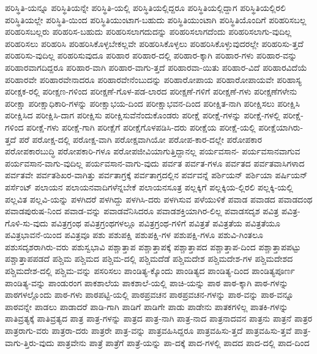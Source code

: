 {ಪರಿಸ್ಥಿತಿ-ಯನ್ನೂ
ಪರಿಸ್ಥಿತಿಯನ್ನೇ
ಪರಿಸ್ಥಿತಿ-ಯಲ್ಲಿ
ಪರಿಸ್ಥಿತಿಯಲ್ಲಿದ್ದರೂ
ಪರಿಸ್ಥಿತಿಯಲ್ಲಿದ್ದಾಗ
ಪರಿಸ್ಥಿತಿಯಲ್ಲಿರಲಿ
ಪರಿಸ್ಥಿತಿಯಲ್ಲೇ
ಪರಿಸ್ಥಿತಿ-ಯಿಂದ
ಪರಿಸ್ಥಿತಿಯುಂಟಾಗ-ಬಹುದು
ಪರಿಸ್ಥಿತಿಯುಂಟಾಗಿ
ಪರಿಸ್ಥಿತಿಯೊಂದಿಗೆ
ಪರಿಹರಿಸಬಲ್ಲ
ಪರಿಹರಿಸಬಲ್ಲರು
ಪರಿಹರಿಸ-ಬಹುದು
ಪರಿಹರಿಸಲಾಗದುದನ್ನು
ಪರಿಹರಿಸಲಾಗದೆಂದು
ಪರಿಹರಿಸಲಾಗು-ವುದಿಲ್ಲ
ಪರಿಹರಿಸಲು
ಪರಿಹರಿಸಿ
ಪರಿಹರಿಸಿಕೊಳ್ಳಬೇಕಲ್ಲವೇ
ಪರಿಹರಿಸಿಕೊಳ್ಳಲು
ಪರಿಹರಿಸಿಕೊಳ್ಳುವುದರಲ್ಲೇ
ಪರಿಹರಿಸು-ತ್ತದೆ
ಪರಿಹರಿಸು-ವುದಿಲ್ಲ
ಪರಿಹರಿಸುವುದೂ
ಪರಿಹಾರ
ಪರಿಹಾರ-ದಲ್ಲಿ
ಪರಿಹಾರ-ಕ್ಕಾಗಿ
ಪರಿಹಾರ-ಗಳು
ಪರಿಹಾರ-ವನ್ನು
ಪರಿಹಾರವಾಗದಿದ್ದರೂ
ಪರಿಹಾರ-ವಾಗಿ
ಪರಿಹಾರ-ವಾಗು-ತ್ತದೆ
ಪರಿಹಾರವಾ-ಯಿತು
ಪರಿಹಾರ-ವಿದೆ
ಪರಿಹಾರವಿದೆಯೆ
ಪರಿಹಾರವೇ
ಪರಿಹಾರವೇನಾದರೂ
ಪರಿಹಾರವೇನೆಂಬುದನ್ನು
ಪರಿಹಾರೋಪಾಯ
ಪರಿಹಾರೋಪಾಯವೇ
ಪರಿಹಾಸ್ಯ
ಪರೀಕ್ಷಕ-ರಲ್ಲಿ
ಪರೀಕ್ಷಣ-ಗಳಿಂದ
ಪರೀಕ್ಷಣೆ-ಗೊಳ-ಪಡ-ಲಾರದ
ಪರೀಕ್ಷಣೆ-ಗಳಿಗೆ
ಪರೀಕ್ಷಣೆ-ಗಳು
ಪರೀಕ್ಷಣೆಗಳೇನು
ಪರೀಕ್ಷಾ
ಪರೀಕ್ಷಾಧಿಕಾರಿ-ಗಳನ್ನು
ಪರೀಕ್ಷಾಭಯ-ದಿಂದ
ಪರೀಕ್ಷಾಭವನ-ದಿಂದ
ಪರೀಕ್ಷಿತ-ನಾಗಿ
ಪರೀಕ್ಷಿಸಲು
ಪರೀಕ್ಷಿಸಿ
ಪರೀಕ್ಷಿಸಿದ
ಪರೀಕ್ಷಿಸಿ-ದಾಗ
ಪರೀಕ್ಷಿಸು
ಪರೀಕ್ಷಿಸುವೆನೆಂದುಕೊಂಡರು
ಪರೀಕ್ಷೆ
ಪರೀಕ್ಷೆ-ಗಳನ್ನು
ಪರೀಕ್ಷೆ-ಗಳಲ್ಲಿ
ಪರೀಕ್ಷೆ-ಗಳಿಂದ
ಪರೀಕ್ಷೆ-ಗಳು
ಪರೀಕ್ಷೆ-ಗಾಗಿ
ಪರೀಕ್ಷೆಗೆ
ಪರೀಕ್ಷೆಗೊಳಪಡಿಸಿ-ದರು
ಪರೀಕ್ಷೆಯ
ಪರೀಕ್ಷೆ-ಯಲ್ಲಿ
ಪರೀಕ್ಷೆಯಾಗಿರು-ತ್ತದೆ
ಪರೆ
ಪರೋಕ್ಷ-ದಲ್ಲಿ
ಪರೋಕ್ಷ-ವಾಗಿ
ಪರೋಕ್ಷವಾಗಿಯೋ
ಪರೋಪ-ಕಾರ-ದಲ್ಲೇ
ಪರೋಪಕಾರ
ಪರೋಪಕಾರಬುದ್ಧಿ
ಪರೋಪಕಾರಿ-ಗಳೂ
ಪರೋಪಜೀವಿಯಾಗುತ್ತಿದ್ದಾನಲ್ಲ
ಪರ್ಯವಸಾನ-
ಪರ್ಯವಸಾನವಾಗುವ
ಪರ್ಯವಸಾನ-ವಾಗು-ವುದಿಲ್ಲ
ಪರ್ಯವಸಾನ-ವಾಗು-ವುದು
ಪರ್ವತ
ಪರ್ವತ-ಗಳೂ
ಪರ್ವತದ
ಪರ್ವತವಾಸಿಗಳಾದ
ಪರ್ವತವೇ
ಪರ್ವತಶಿಖರ-ವಾಗಿತ್ತು
ಪರ್ವತಾಗ್ರಕ್ಕೆ
ಪರ್ವತಾಗ್ರದಲ್ಲಿನ
ಪರ್ವವನ್ನೆ
ಪರ್ಶಿಯನ್
ಪರ್ಶಿಯಾ
ಪರ್ಷಿಯನ್
ಪರ್ಸೆಂಟ್
ಪಲಾಯನ
ಪಲಾಯನವಾದಿಗಳೆನ್ನಬೇಕೆ
ಪಲಾಯನಸೂತ್ರ
ಪಲ್ಲಕ್ಕಿಗೆ
ಪಲ್ಲಕ್ಕಿಯ-ಲ್ಲಿರಲಿ
ಪಲ್ಲಕ್ಕಿ-ಯಲ್ಲಿ
ಪಲ್ಲವಿತ
ಪಲ್ಲವಿ-ಯನ್ನು
ಪಳಗಿದರೆ
ಪಳಗಿದ್ದು
ಪಳಗಿಸಿ-ದರು
ಪಳಗಿಸುವ
ಪಳೆಯುಳಿಕೆ
ಪವಾಡ
ಪವಾಡದ
ಪವಾಡದಂಥ
ಪವಾಡಪುರುಷ-ನಿಂದ
ಪವಾಡ-ವನ್ನು
ಪವಾಡವೆನಿಸಿದರೂ
ಪವಾಡಶಕ್ತಿಯಾಗಿರ-ಲಿಲ್ಲ
ಪವಾಡಸದೃಶ
ಪವಿತ್ರ
ಪವಿತ್ರ-ಗೊಳಿ-ಸು-ವುದು
ಪವಿತ್ರಗ್ರಂಥ
ಪವಿತ್ರಗ್ರಂಥಗಳಲ್ಲೂ
ಪವಿತ್ರಗ್ರಂಥ-ಗಳಿಗೆ
ಪವಿತ್ರತೆ
ಪವಿತ್ರತೆಯ
ಪವಿತ್ರತೆಯೂ
ಪವಿತ್ರಭಾವನೆ-ಯಿಂದ
ಪವಿತ್ರವೂ
ಪಶು
ಪಶುಪಕ್ಷಿ
ಪಶುಪಕ್ಷಿ-ಗಳ
ಪಶುಪಕ್ಷಿ-ಗಳೂ
ಪಶುವಿ-ಗಿಂತಲೂ
ಪಶುಸದೃಶರಾಗಿರು-ವರು
ಪಶುಸ್ವಭಾವಿ
ಪಶ್ಚಾತ್ತಾಪ
ಪಶ್ಚಾತ್ತಾಪಕ್ಕೆ
ಪಶ್ಚಾತ್ತಾಪದ
ಪಶ್ಚಾತ್ತಾಪ-ದಿಂದ
ಪಶ್ಚಾತ್ತಾಪಪಟ್ಟು
ಪಶ್ಚಾತ್ತಾಪಪಡದೆ
ಪಶ್ಚಿಮ
ಪಶ್ಚಿಮದ
ಪಶ್ಚಿಮ-ದಲ್ಲಿ
ಪಶ್ಚಿಮದೆಡೆ
ಪಶ್ಚಿಮದೇಶ
ಪಶ್ಚಿಮದೇಶ-ಗಳ
ಪಶ್ಚಿಮದೇಶದ
ಪಶ್ಚಿಮದೇಶ-ದಲ್ಲಿ
ಪಶ್ಚಿಮ-ವನ್ನು
ಪಸರಿಸಲು
ಪಾಂಡಿತ್ಯ-ಕ್ಕೊಂದು
ಪಾಂಡಿತ್ಯದ
ಪಾಂಡಿತ್ಯ-ದಿಂದ
ಪಾಂಡಿತ್ಯಪೂರ್ಣ
ಪಾಂಡಿತ್ಯ-ವನ್ನು
ಪಾಂಡುರಂಗ
ಪಾಕಶಾಲೆಯ
ಪಾಕಶಾಲೆ-ಯಲ್ಲಿ
ಪಾಚಿ-ಯನ್ನು
ಪಾಠ
ಪಾಠ-ಕ್ಕಾಗಿ
ಪಾಠ-ಗಳನ್ನು
ಪಾಠಗಳಲ್ಲೊಂದು
ಪಾಠ-ಗಳು
ಪಾಠಪಟ್ಟಿ-ಯಲ್ಲಿ
ಪಾಠಪ್ರವಚನ
ಪಾಠಪ್ರವಚನ-ಗಳನ್ನು
ಪಾಠ-ವನ್ನು
ಪಾಠ-ವನ್ನೂ
ಪಾಠವನ್ನೇ
ಪಾಡಲು
ಪಾಡಾದರೆ
ಪಾಡಿ-ಗಾಗಿ
ಪಾಡಿಗೆ
ಪಾಡಿಗೇ
ಪಾಡು
ಪಾಡೇನು
ಪಾತಕಗಳಿಲ್ಲ
ಪಾತಕಿ-ಗಳನ್ನು
ಪಾತಿವ್ರತ್ಯಕ್ಕೆ
ಪಾತಿವ್ರತ್ಯದ
ಪಾತ್ರ
ಪಾತ್ರ-ಗಳನ್ನು
ಪಾತ್ರದ
ಪಾತ್ರ-ನಾಗಿ
ಪಾತ್ರ-ನಾದ
ಪಾತ್ರನಾದವನ
ಪಾತ್ರನು
ಪಾತ್ರನೆ
ಪಾತ್ರರ
ಪಾತ್ರರಾಗು-ವರು
ಪಾತ್ರರಾ-ದರು
ಪಾತ್ರರೇ
ಪಾತ್ರ-ವನ್ನು
ಪಾತ್ರವಹಿಸಿದ್ದರೂ
ಪಾತ್ರವಹಿಸು-ತ್ತದೆ
ಪಾತ್ರವಹಿಸು-ತ್ತವೆ
ಪಾತ್ರ-ವಾಗು-ತ್ತಿರು-ವುದು
ಪಾತ್ರವೇನು
ಪಾತ್ರೆ
ಪಾತ್ರೆಗೆ
ಪಾತ್ರೆ-ಯನ್ನು
ಪಾ-ದಕ್ಕೆ
ಪಾದ-ಗಳಲ್ಲಿ
ಪಾದದ
ಪಾದ-ದಲ್ಲಿ
ಪಾದ-ದಿಂದ
}

